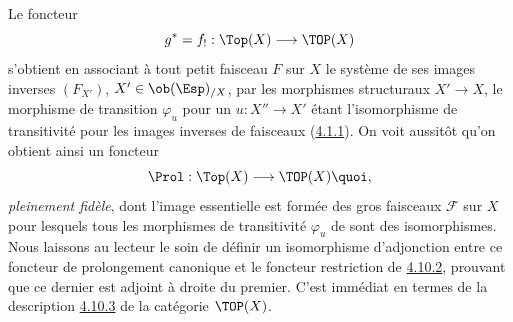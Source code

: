 \documentclass[10pt]{../fichiers-configuration-latex/smfart}
\begin{document}
\subsubsection{}
Le foncteur
$$
g^{\ast}=f_{!}:\Top(X)\longrightarrow \TOP(X)
$$
s'obtient en associant à tout petit faisceau $F$ sur $X$ le système
de ses images inverses $(F_{X'})$, $X'\in \ob (\Esp)_{/X}$, par les
morphismes structuraux $X'\rightarrow X$, le morphisme de transition
$\varphi_u$ pour un $u:X''\rightarrow X'$ étant l'isomorphisme de
transitivité pour les images inverses de faisceaux
(\hyperref[IV.subsubsec4.1.1]{4.1.1}). On voit aussitôt qu'on obtient ainsi un
foncteur
$$
\Prol:\Top(X)\longrightarrow \TOP(X){\quoi},
$$
\emph{pleinement fidèle}, dont l'image essentielle est formée
des gros faisceaux $ℱ$ sur $X$ pour lesquels tous les
morphismes de transitivité $\varphi_u$ de  sont des
isomorphismes. Nous laissons au lecteur le soin de définir un
isomorphisme d'adjonction entre ce foncteur de prolongement
canonique et le foncteur restriction de \hyperref[IV.subsubsec4.10.2]{4.10.2},
prouvant que ce dernier est adjoint à droite du premier. C'est
immédiat en termes de la description \hyperref[IV.subsubsec4.10.3]{4.10.3} de
la catégorie $\TOP(X)$.
\end{document}

